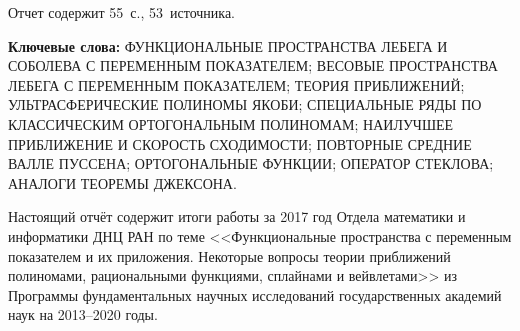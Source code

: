\Referat %

Отчет содержит 55~с., 53~источника.

 \bigskip
 \textbf{ Ключевые
  слова:}
  ФУНКЦИОНАЛЬНЫЕ ПРОСТРАНСТВА ЛЕБЕГА И СОБОЛЕВА С ПЕРЕМЕННЫМ ПОКАЗАТЕЛЕМ; ВЕСОВЫЕ ПРОСТРАНСТВА ЛЕБЕГА С ПЕРЕМЕННЫМ ПОКАЗАТЕЛЕМ; ТЕОРИЯ ПРИБЛИЖЕНИЙ; УЛЬТРАСФЕРИЧЕСКИЕ ПОЛИНОМЫ ЯКОБИ; СПЕЦИАЛЬНЫЕ РЯДЫ ПО КЛАССИЧЕСКИМ ОРТОГОНАЛЬНЫМ ПОЛИНОМАМ; НАИЛУЧШЕЕ ПРИБЛИЖЕНИЕ И СКОРОСТЬ СХОДИМОСТИ; ПОВТОРНЫЕ СРЕДНИЕ ВАЛЛЕ ПУССЕНА; ОРТОГОНАЛЬНЫЕ ФУНКЦИИ; ОПЕРАТОР СТЕКЛОВА; АНАЛОГИ ТЕОРЕМЫ ДЖЕКСОНА.

 \bigskip

Настоящий отчёт содержит итоги работы за 2017 год Отдела математики и информатики ДНЦ РАН по теме
<<Функциональные пространства с переменным показателем и их приложения. Некоторые вопросы теории приближений полиномами, рациональными функциями, сплайнами и вейвлетами>>
из Программы фундаментальных научных исследований государственных академий наук на 2013–2020 годы.





%
%
%
%
